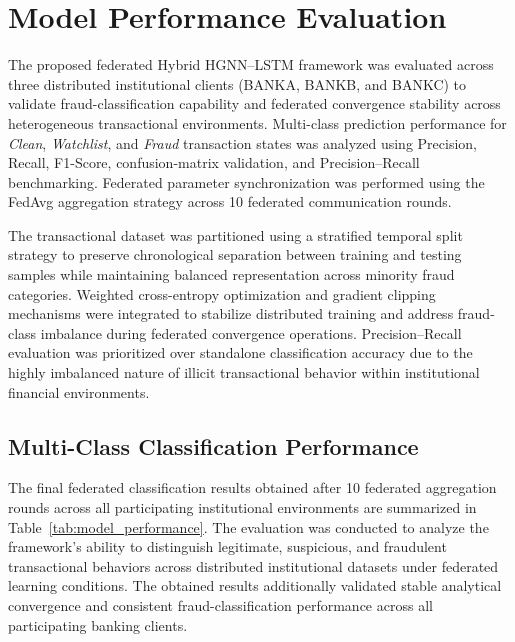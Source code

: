 \section[Model Performance Evaluation]{\textbf{Model Performance Evaluation}}

The proposed federated Hybrid HGNN--LSTM framework was evaluated across three distributed institutional clients (BANKA, BANKB, and BANKC) to validate fraud-classification capability and federated convergence stability across heterogeneous transactional environments. Multi-class prediction performance for \textit{Clean}, \textit{Watchlist}, and \textit{Fraud} transaction states was analyzed using Precision, Recall, F1-Score, confusion-matrix validation, and Precision--Recall benchmarking. Federated parameter synchronization was performed using the FedAvg aggregation strategy across 10 federated communication rounds.

The transactional dataset was partitioned using a stratified temporal split strategy to preserve chronological separation between training and testing samples while maintaining balanced representation across minority fraud categories. Weighted cross-entropy optimization and gradient clipping mechanisms were integrated to stabilize distributed training and address fraud-class imbalance during federated convergence operations. Precision--Recall evaluation was prioritized over standalone classification accuracy due to the highly imbalanced nature of illicit transactional behavior within institutional financial environments.

\subsection[Multi-Class Classification Performance]{\textbf{Multi-Class Classification Performance}}

The final federated classification results obtained after 10 federated aggregation rounds across all participating institutional environments are summarized in Table~\ref{tab:model_performance}. The evaluation was conducted to analyze the framework’s ability to distinguish legitimate, suspicious, and fraudulent transactional behaviors across distributed institutional datasets under federated learning conditions. The obtained results additionally validated stable analytical convergence and consistent fraud-classification performance across all participating banking clients.


